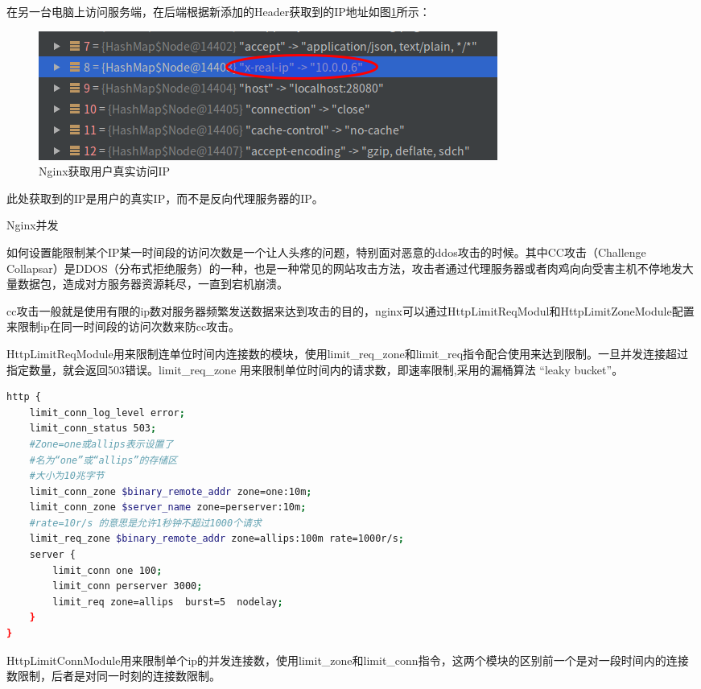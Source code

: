\documentclass[12pt]{book}
\makeatletter
\numberwithin{dummy}{section}
\theoremstyle{ocrenumbox}
\theoremstyle{blacknumex}
\theoremstyle{blacknumbox}
\theoremstyle{ocrenum}
\renewcommand{\subsection}{\@startsection {subsection}{2}{\z@}
	{-3ex \@plus -0.1ex \@minus -.4ex}
	{0.5ex \@plus.2ex }
	{\normalfont\sffamily\bfseries}}
\makeatother
\begin{document}
在另一台电脑上访问服务端，在后端根据新添加的Header获取到的IP地址如图\ref{fig:nginxgetrealip}所示：

\begin{figure}[htbp]
	\centering
	\includegraphics[scale=0.6]{nginxgetrealip.png}
	\caption{Nginx获取用户真实访问IP}
	\label{fig:nginxgetrealip}
\end{figure}

此处获取到的IP是用户的真实IP，而不是反向代理服务器的IP。

\subsection{Nginx并发}

如何设置能限制某个IP某一时间段的访问次数是一个让人头疼的问题，特别面对恶意的ddos攻击的时候。其中CC攻击（Challenge Collapsar）是DDOS（分布式拒绝服务）的一种，也是一种常见的网站攻击方法，攻击者通过代理服务器或者肉鸡向向受害主机不停地发大量数据包，造成对方服务器资源耗尽，一直到宕机崩溃。

cc攻击一般就是使用有限的ip数对服务器频繁发送数据来达到攻击的目的，nginx可以通过HttpLimitReqModul和HttpLimitZoneModule配置来限制ip在同一时间段的访问次数来防cc攻击。

HttpLimitReqModule用来限制连单位时间内连接数的模块，使用limit\_req\_zone和limit\_req指令配合使用来达到限制。一旦并发连接超过指定数量，就会返回503错误。limit\_req\_zone 用来限制单位时间内的请求数，即速率限制,采用的漏桶算法 “leaky bucket”。

\begin{lstlisting}[language=bash]
http {
	limit_conn_log_level error;
	limit_conn_status 503;
	#Zone=one或allips表示设置了
	#名为“one”或“allips”的存储区
	#大小为10兆字节
	limit_conn_zone $binary_remote_addr zone=one:10m;
	limit_conn_zone $server_name zone=perserver:10m;
	#rate=10r/s 的意思是允许1秒钟不超过1000个请求
	limit_req_zone $binary_remote_addr zone=allips:100m rate=1000r/s;  
	server {
		limit_conn one 100;
		limit_conn perserver 3000;
		limit_req zone=allips  burst=5  nodelay;
	}
}
\end{lstlisting}

HttpLimitConnModule用来限制单个ip的并发连接数，使用limit\_zone和limit\_conn指令，这两个模块的区别前一个是对一段时间内的连接数限制，后者是对同一时刻的连接数限制。
\end{document}
